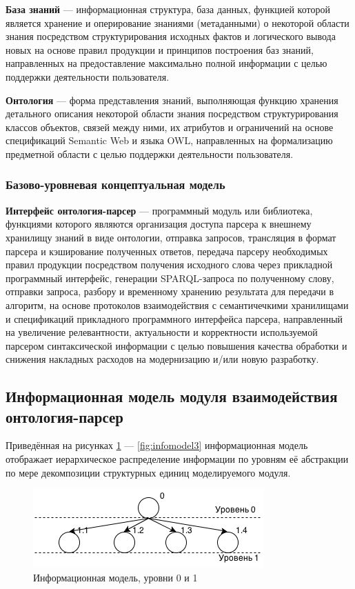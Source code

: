 \textbf{База знаний} --- информационная структура, база данных, функцией которой является хранение и оперирование знаниями (метаданными) о некоторой области знания посредством структурирования исходных фактов и логического вывода новых на основе правил продукции и принципов построения баз знаний, направленных на предоставление максимально полной информации с целью поддержки деятельности пользователя.

\textbf{Онтология} --- форма представления знаний, выполняющая функцию хранения детального описания некоторой области знания посредством структурирования классов объектов, связей между ними, их атрибутов и ограничений на основе спецификаций Semantic Web и языка OWL, направленных на формализацию предметной области с целью поддержки деятельности пользователя.

\subsubsection{Базово-уровневая концептуальная модель}

\textbf{Интерфейс онтология-парсер} --- программный модуль или библиотека, функциями которого являются организация доступа парсера к внешнему хранилищу знаний в виде онтологии, отправка запросов, трансляция в формат парсера и кэширование полученных ответов, передача парсеру необходимых правил продукции посредством получения исходного слова через прикладной программный интерфейс, генерации SPARQL-запроса по полученному слову, отправки запроса, разбору и временному хранению результата для передачи в алгоритм, на основе протоколов взаимодействия с семантичечкими хранилищами и спецификаций прикладного программного интерфейса парсера, направленный на увеличение релевантности, актуальности и корректности используемой парсером синтаксической информации с целью повышения качества обработки и снижения накладных расходов на модернизацию и/или новую разработку.

\subsection{Информационная модель модуля взаимодействия онтология-парсер}

Приведённая на рисунках \ref{fig:infomodel0} --- \ref{fig:infomodel3} информационная модель отображает иерархическое распределение информации по уровням её абстракции по мере декомпозиции структурных единиц моделируемого модуля.

\begin{figure}[H]
	\centering
		\includegraphics[scale=1.0]{images/infomodel0.png}
	\caption{\small Информационная модель, уровни 0 и 1}
	\label{fig:infomodel0}
\end{figure}

